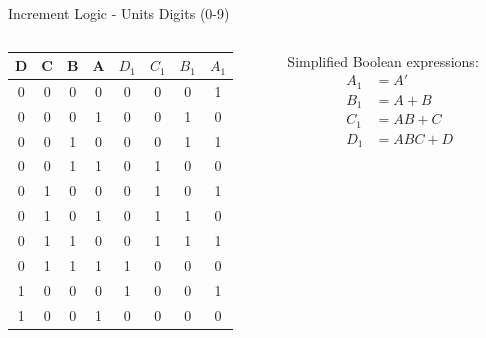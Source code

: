 \documentclass{beamer}
\begin{document}
\begin{frame}{Increment Logic - Units Digits (0-9)}
    \begin{columns}
        \begin{column}{0.5\textwidth}
            \begin{table}
                \centering
                \scriptsize
                \begin{tabular}{|c|c|c|c|c|c|c|c|}
                \hline
                D & C & B & A & $D_1$ & $C_1$ & $B_1$ & $A_1$ \\ 
                \hline
                0 & 0 & 0 & 0 & 0 & 0 & 0 & 1 \\
                0 & 0 & 0 & 1 & 0 & 0 & 1 & 0 \\
                0 & 0 & 1 & 0 & 0 & 0 & 1 & 1 \\
                0 & 0 & 1 & 1 & 0 & 1 & 0 & 0 \\
                0 & 1 & 0 & 0 & 0 & 1 & 0 & 1 \\
                0 & 1 & 0 & 1 & 0 & 1 & 1 & 0 \\
                0 & 1 & 1 & 0 & 0 & 1 & 1 & 1 \\
                0 & 1 & 1 & 1 & 1 & 0 & 0 & 0 \\
                1 & 0 & 0 & 0 & 1 & 0 & 0 & 1 \\
                1 & 0 & 0 & 1 & 0 & 0 & 0 & 0 \\
                \hline
                \end{tabular}
            \end{table}
        \end{column}
        \begin{column}{0.5\textwidth}
            Simplified Boolean expressions:
            \begin{align*}
                A_1 &= A' \\
                B_1 &= A + B \\
                C_1 &= AB + C \\
                D_1 &= ABC + D
            \end{align*}
        \end{column}
    \end{columns}
\end{frame}
\end{document}
